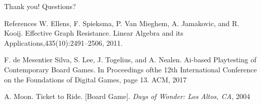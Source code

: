 \documentclass[12pt]{beamer}
\begin{document}
\begin{frame}{Thank you!}
    Questions?
\end{frame}

\begin{frame}{References}
    W. Ellens, F. Spieksma, P. Van Mieghem, 
    A. Jamakovic, and R. Kooij.
    Effective Graph Resistance. Linear Algebra and
    its Applications,435(10):2491–2506, 2011.
    
    \vspace{.5cm}
    F. de Mesentier Silva, S. Lee, J. Togelius, and A. Nealen.
    Ai-based Playtesting of Contemporary Board Games.
    In Proceedings ofthe 12th International Conference on the
    Foundations of Digital Games, page 13.  ACM, 2017
    
    \vspace{.5cm}   
    A. Moon.
    Ticket to Ride. [Board Game].
    \textit{Days of Wonder: Los Altos, CA}, 2004
\end{frame}
\end{document}
